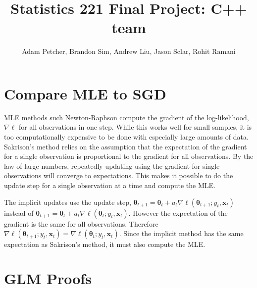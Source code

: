 \documentclass{article}
\title{Statistics 221 Final Project: C++ team}
\author{Adam Petcher, Brandon Sim, Andrew Liu, Jason Sclar, Rohit Ramani}
\renewcommand{\vec}[1]{\boldsymbol{#1}}
\begin{document}
\maketitle

\section{Compare MLE to SGD}
MLE methods such Newton-Raphson compute the gradient of the log-likelihood, $\nabla\ell$ for all observations in one step. While this works well for small samples, it is too computationally expensive to be done with especially large amounts of data. Sakrison's method relies on the assumption that the expectation of the gradient for a single observation is proportional to the gradient for all observations. By the law of large numbers, repeatedly updating using the gradient for single observations will converge to expectations. This makes it possible to do the update step for a single observation at a time and compute the MLE.

The implicit updates use the update step, $\vec{\theta}_{t+1} = \vec{\theta}_t + a_t\nabla\ell(\vec{\theta}_{t+1}; y_t, \vec{x}_t)$ instead of $\vec{\theta}_{t+1} = \vec{\theta}_t + a_t\nabla\ell(\vec{\theta}_{t}; y_t, \vec{x}_t)$. However the expectation of the gradient is the same for all observations. Therefore $\nabla\ell(\vec{\theta}_{t+1}; y_t, \vec{x}_t) = \nabla\ell(\vec{\theta}_{t}; y_t, \vec{x}_t)$. Since the implicit method has the same expectation as Sakrison's method, it must also compute the MLE.


\section{GLM Proofs}
\end{document}
